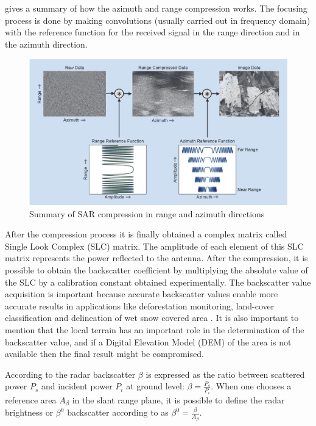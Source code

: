  gives a summary of how the azimuth and range compression works. The focusing process is done by making convolutions (usually carried out in frequency domain) with the reference function for the received signal in the range direction and in the azimuth direction.
\begin{figure}[H]
    \centering
    \includegraphics[width=\linewidth]{Cap1/compres.png}
    \caption{Summary of SAR compression in range and azimuth directions \cite{tutorial}}
    \label{fig:sar_compression}
\end{figure}

After the compression process it is finally obtained a complex matrix called Single Look Complex (SLC) matrix. The amplitude of each element of this SLC matrix represents the power reflected to the antenna. After the compression, it is possible to obtain the backscatter coefficient by multiplying the absolute value of the SLC by a calibration constant obtained experimentally.
The backscatter value acquisition is important because accurate backscatter values enable more accurate results in applications like deforestation monitoring, land-cover classification and delineation of wet snow covered area \cite{Small}. It is also important to mention that the local terrain has an important role in the determination of the backscatter value, and if a Digital Elevation Model (DEM) of the area is not available then the final result might be compromised.

According to \cite{Small} the radar backscatter $\beta$ is expressed as the ratio between scattered power $P_s$ and incident power $P_i$ at ground level: $\beta = \frac{P_s}{P_i}$. When one chooses a reference area $A_\beta$ in the slant range plane, it is possible to define the radar brightness or  $\beta^0$ backscatter according to \cite{Raney} as $\beta^0 = \frac{\beta}{A_\beta}$.

